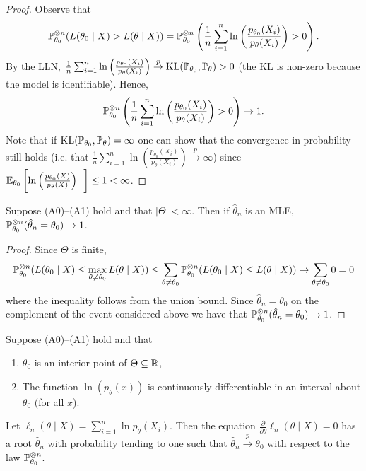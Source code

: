 \begin{proof}
	Observe that \[
		\mathbb{P}^{\otimes n}_{\theta_0}(L(\theta_0 \mid X) > L(\theta \mid X)) = 
		\mathbb{P}^{\otimes n}_{\theta_0}\left(\frac{1}{n} \sum_{i=1}^n \ln\left(  \frac{p_{\theta_0}(X_i)}{p_\theta(X_i)} \right) > 0 \right).
	\] By the LLN,  $\frac{1}{n}\sum_{i=1}^n \ln\left(  \frac{p_{\theta_0}(X_i)}{p_\theta(X_i)} \right) \overset{p}{\to} \text{KL}(\mathbb{P}_{\theta_0}, \mathbb{P}_\theta) > 0$ (the KL is non-zero because the model is identifiable). Hence, \[
	\mathbb{P}^{\otimes n}_{\theta_0}\left(\frac{1}{n} \sum_{i=1}^n \ln\left(  \frac{p_{\theta_0}(X_i)}{p_\theta(X_i)} \right) > 0 \right) \to 1. 
	\]
	Note that if $\text{KL}(\mathbb{P}_{\theta_0}, \mathbb{P}_\theta) = \infty$ one can show that the convergence in probability still holds (i.e. that $\frac{1}{n}\sum_{i=1}^n \ln\left(  \frac{p_{\theta_0}(X_i)}{p_\theta(X_i)} \right) \overset{p}{\to} \infty$) since $\mathbb{E}_{\theta_0} \left[\ln\left(  \frac{p_{\theta_0}(X)}{p_\theta(X)} \right)^- \right] \leq 1 < \infty$.
\end{proof} 

\begin{corollary}
	Suppose (A0)--(A1) hold and that $|\Theta| < \infty$. Then if $\hat{\theta}_n$ is an MLE, $\mathbb{P}^{\otimes n}_{\theta_0}(\hat{\theta}_n = \theta_0) \to 1$.  
\end{corollary}

\begin{proof}
	Since $\Theta$ is finite, \[
		\mathbb{P}^{\otimes n}_{\theta_0}(L(\theta_0 \mid X) \leq \max_{\theta \neq \theta_0} L(\theta \mid X)) \leq \sum_{\theta \neq \theta_0} \mathbb{P}^{\otimes n}_{\theta_0}(L(\theta_0 \mid X) \leq L(\theta \mid X)) \to  \sum_{\theta \neq \theta_0}  0 = 0
	\] where the inequality follows from the union bound. Since $\hat{\theta}_n = \theta_0$ on the complement of the event considered above we have that $\mathbb{P}^{\otimes n}_{\theta_0}(\hat{\theta}_n = \theta_0) \to 1$.  
\end{proof}
	
\begin{theorem}
	Suppose (A0)--(A1) hold and that
	\begin{enumerate}
		\item[(A2)$\phantom{'}$] $\theta_0$ is an interior point of $\Theta \subseteq \mathbb{R}$,
		\item[(A3)$'$] The function $\ln(p_\theta(x))$ is continuously differentiable in an interval about $\theta_0$ (for all $x$). 
	\end{enumerate}	
	Let $\ell_n(\theta \mid X) = \sum_{i=1}^n \ln p_\theta(X_i)$. Then the equation $\frac{\partial}{\partial \theta} \ell_n(\theta \mid X) = 0$ has a root $\hat \theta_n$ with probability tending to one such that $\hat \theta_n \overset{p}{\to} \theta_0$ with respect to the law $\mathbb{P}^{\otimes n}_{\theta_0}$. 
	
\end{theorem}

